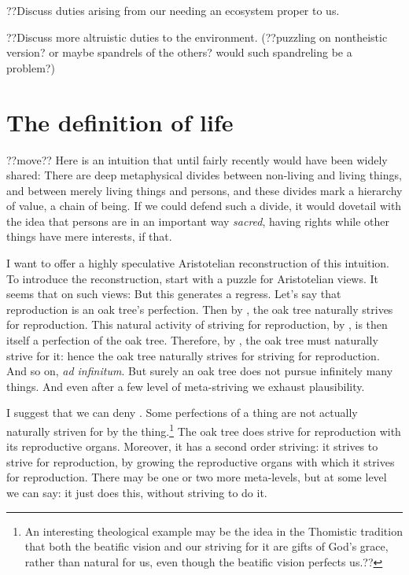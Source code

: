 ??Discuss duties arising from our needing an ecosystem proper to us.

??Discuss more altruistic duties to the environment. (??puzzling on nontheistic version? or maybe spandrels of the others? would
such spandreling be a problem?)

\section{The definition of life}??move??
Here is an intuition that until fairly recently would have been widely shared: There are deep metaphysical divides between non-living and living things,
and between merely living things and persons, and these divides mark a hierarchy of value, a chain of being. If we could defend such a divide, it would
dovetail with the idea that persons are in an important way \textit{sacred}, having rights while other things have mere interests, if that.

I want to offer a highly speculative Aristotelian reconstruction of this intuition. To introduce the reconstruction, start with a puzzle for
Aristotelian views. It seems that on such views:
But this generates a regress. Let's say that reproduction is an oak tree's perfection. Then by , the oak tree naturally strives for
reproduction. This natural activity of striving for reproduction, by , is then itself a perfection of the oak tree. Therefore,
by , the oak tree must naturally strive for it: hence the oak tree naturally strives for striving for reproduction. And so on,
\textit{ad infinitum}. But surely an oak tree does not pursue infinitely many things. And even after a few level of meta-striving we exhaust plausibility.

I suggest that we can deny . Some perfections of a thing are not actually naturally striven for by the thing.\footnote{An interesting
theological example may be the idea in the Thomistic tradition that both the beatific vision and our striving for it are gifts of God's grace, rather than
natural for us, even though the beatific vision perfects us.??} The oak tree does strive for reproduction with its reproductive organs. Moreover, it has a
second order striving: it strives to strive for reproduction, by growing the reproductive organs with which it strives for reproduction. There may be one or
two more meta-levels, but at some level we can say: it just does this, without striving to do it.

